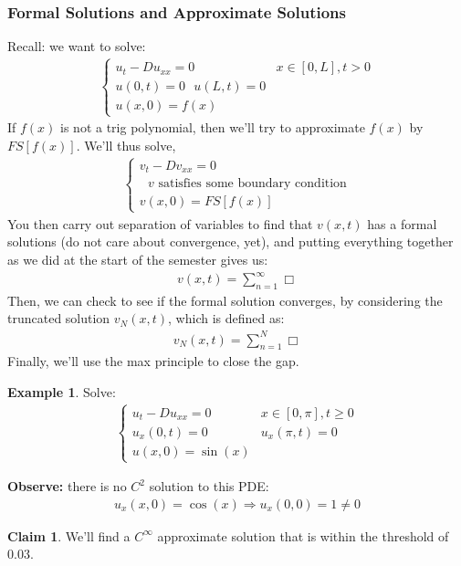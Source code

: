 \documentclass[11pt]{scrartcl}
\theoremstyle{definition}
\newtheorem{ex}{Example}
\newtheorem{claim}{Claim}
\theoremstyle{remark}
\begin{document}
\subsubsection{Formal Solutions and Approximate Solutions}
Recall: we want to solve:
\begin{align}
		\begin{cases}
			u_t - Du_{xx} = 0 & x \in [0,L], t > 0  \\
			u(0,t) = 0 \text{ } u(L,t) = 0 \\
			u(x,0) = f(x) 
		\end{cases}	
\end{align}
If $f(x)$ is not a trig polynomial, then we'll try to approximate $f(x)$ by $FS[f(x)]$. We'll thus solve, 
\begin{align*}
	\begin{cases}
		v_t - Dv_{xx} = 0 \\
		\text{ $v$ satisfies some boundary condition} \\
		v(x,0) = FS[f(x)] 
	\end{cases}
\end{align*}
You then carry out separation of variables to find that $v(x,t)$ has a formal solutions (do not care about convergence, yet), and putting everything together as we did at the start of the semester gives us:
\begin{align*}
	v(x,t) = \sum_{n=1}^\infty \Box 
\end{align*}
Then, we can check to see if the formal solution converges, by considering the truncated solution $v_N(x,t)$, which is defined as:
\begin{align*}
	v_N(x,t) = \sum_{n=1}^N \Box
\end{align*}
Finally, we'll use the max principle to close the gap.
\begin{ex}
	Solve: 
	\begin{align*}
		\begin{cases}
			u_t - D u_{xx} = 0 & x \in [0, \pi], t \geq 0 \\
			u_x(0,t) = 0 & u_x(\pi,t) = 0 \\
			u(x,0) = \sin (x) 
		\end{cases}
	\end{align*}
\end{ex}
\textbf{Observe:} there is no $C^2$ solution to this PDE: 
\begin{align*}
	u_x(x,0) = \cos(x) \Rightarrow u_x(0,0) = 1 \neq 0 
\end{align*}
\begin{claim}
	We'll find a $C^\infty$ approximate solution that is within the threshold of $0.03$.
\end{claim}
\end{document}
